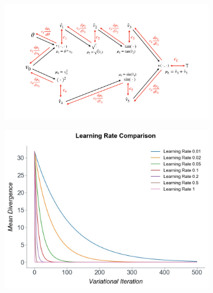  \begin{figure}
 \label{PCBP_numerical_results}
\vspace{-1.5cm}
\begin{subfigure}{\linewidth}
\centering
\includegraphics[scale=0.15]{chapter_6_figures/pc_schematic.pdf}
\end{subfigure}
\begin{subfigure}{.5\linewidth}
\centering
\includegraphics[scale=0.25]{chapter_6_figures/numerics_proper_learning_rate_comparison.jpg}
\end{subfigure}%
\begin{subfigure}{.5\linewidth}
\centering

\end{subfigure}
\end{figure}

